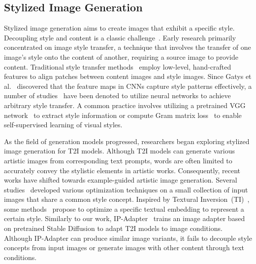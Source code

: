 \vspace{-0.7em}
\subsection{Stylized Image Generation}

Stylized image generation aims to create images that exhibit a specific style. Decoupling style and content is a classic challenge~\cite{tenenbaum2000separating}.
Early research primarily concentrated on image style transfer, a technique that involves the transfer of one image's style onto the content of another, requiring a source image to provide content. 
Traditional style transfer methods~\cite{hertzmann2001image,wang2004efficient, zhang2013style} employ low-level, hand-crafted features to align patches between content images and style images. Since Gatys et al.~\cite{gatys2016image} discovered that the feature maps in CNNs capture style patterns effectively, a number of studies~\cite{huang2017arbitrary, li2017universal, texler2020arbitrary, liu2021adaattn, an2021artflow, deng2022stytr2, zhang2022domain} have been denoted to utilize neural networks to achieve arbitrary style transfer. A common practice involves utilizing a pretrained VGG network~\cite{simonyan2014very} to extract style information or compute Gram matrix loss~\cite{gatys2016image} to enable self-supervised learning of visual styles.

As the field of generation models progressed, researchers began exploring stylized image generation for T2I models. Although T2I models can generate various artistic images from corresponding text prompts, words are often limited to accurately convey the stylistic elements in artistic works. Consequently, recent works have shifted towards example-guided artistic image generation. Several studies~\cite{dreambooth, shi2023instancebooth, customdiffusion, hu2022lora} developed various optimization techniques on a small collection of input images that share a common style concept. 
Inspired by Textural Inversion~(TI)~\cite{TI}, some methods~\cite{zhang2023inversion, ahn2023dreamstyler, sohn2023styledrop} propose to optimize a specific textual embedding to represent a certain style. Similarly to our work, IP-Adapter~\cite{ye2023ipadapter} trains an image adapter based on pretrained Stable Diffusion to adapt T2I models to image conditions. 
Although IP-Adapter can produce similar image variants, it fails to decouple style concepts from input images or generate images with other content through text conditions.


